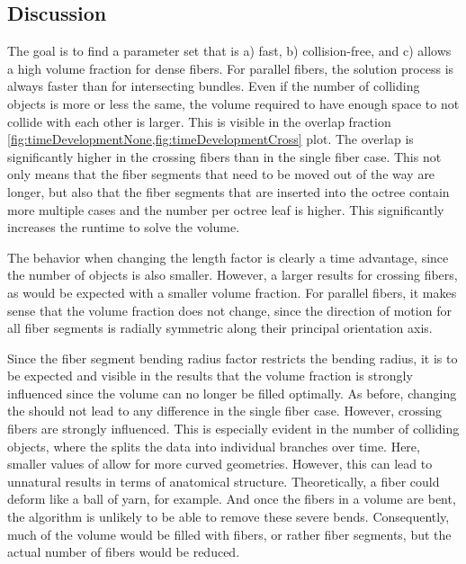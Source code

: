 \subsection{Discussion}
%
The goal is to find a parameter set that is a) fast, b) collision-free, and c) allows a high volume fraction for dense fibers.
For parallel fibers, the solution process is always faster than for intersecting bundles.
Even if the number of colliding objects is more or less the same, the volume required to have enough space to not collide with each other is larger.
This is visible in the overlap fraction \cref{fig:timeDevelopmentNone,fig:timeDevelopmentCross} plot.
The overlap is significantly higher in the crossing fibers than in the single fiber case.
This not only means that the fiber segments that need to be moved out of the way are longer, but also that the fiber segments that are inserted into the octree contain more multiple cases and the number per octree leaf is higher.
This significantly increases the runtime to solve the volume.
\par
%
The behavior when changing the length factor \segLengthFactor{} is clearly a time advantage, since the number of objects is also smaller.
However, a larger \segLengthFactor{} results for crossing fibers, as would be expected with a smaller volume fraction.
For parallel fibers, it makes sense that the volume fraction does not change, since the direction of motion for all fiber segments is radially symmetric along their principal orientation axis.
\par
%
Since the fiber segment bending radius factor \segRadiusFactor{} restricts the bending radius, it is to be expected and visible in the results that the volume fraction is strongly influenced since the volume can no longer be filled optimally.
As before, changing the \segRadiusFactor{} should not lead to any difference in the single fiber case.
However, crossing fibers are strongly influenced.
This is especially evident in the number of colliding objects, where the \segRadiusFactor{} splits the data into individual branches over time.
Here, smaller values of \segRadiusFactor{} allow for more curved geometries.
However, this can lead to unnatural results in terms of anatomical structure.
Theoretically, a fiber could deform like a ball of yarn, for example.
And once the fibers in a volume are bent, the algorithm is unlikely to be able to remove these severe bends.
Consequently, much of the volume would be filled with fibers, or rather fiber segments, but the actual number of fibers would be reduced.
